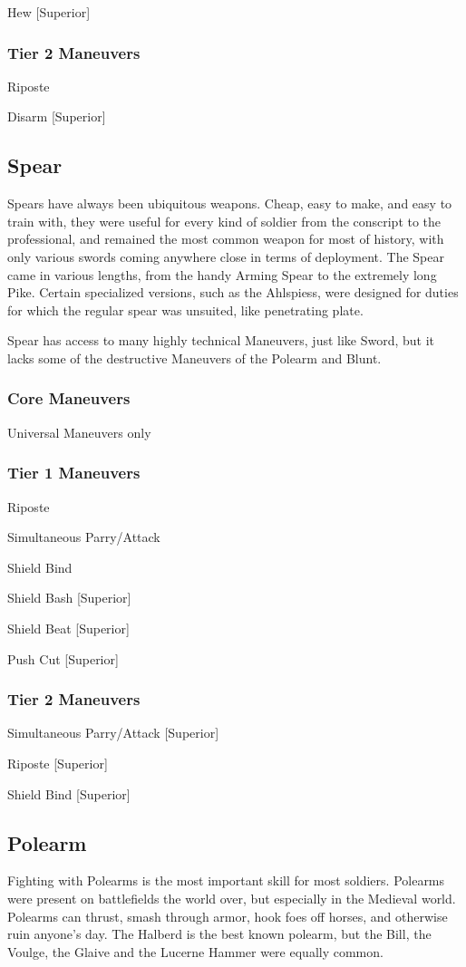 \documentclass[oneside,11pt,english]{book}
\begin{document}
Hew [Superior] 

\subsubsection{Tier 2 Maneuvers}
Riposte

Disarm [Superior]

\subsection{Spear}
Spears have always been ubiquitous weapons. Cheap, easy to make, and easy to train with, they 
were useful for every kind of soldier from the conscript to the professional, and remained the most 
common weapon for most of history, with only various swords coming anywhere close in terms of 
deployment. The Spear came in various lengths, from the handy Arming Spear to the extremely long Pike. 
Certain specialized versions, such as the Ahlspiess, were designed for duties for which the regular spear 
was unsuited, like penetrating plate. 

Spear has access to many highly technical Maneuvers, just like Sword, but it lacks some of the destructive 
Maneuvers of the Polearm and Blunt. 

\subsubsection{Core Maneuvers}
Universal Maneuvers only 

\subsubsection{Tier 1 Maneuvers}
Riposte 

Simultaneous Parry/Attack 

Shield Bind 

Shield Bash [Superior] 

Shield Beat [Superior] 

Push Cut [Superior] 

\subsubsection{Tier 2 Maneuvers}
Simultaneous Parry/Attack [Superior] 

Riposte [Superior] 

Shield Bind [Superior] 

\subsection{Polearm}
Fighting with Polearms is the most important skill for most soldiers. Polearms were present on 
battlefields the world over, but especially in the Medieval world. Polearms can thrust, smash through 
armor, hook foes off horses, and otherwise ruin anyone’s day. The Halberd is the best known polearm, 
but the Bill, the Voulge, the Glaive and the Lucerne Hammer were equally common. 
\end{document}
